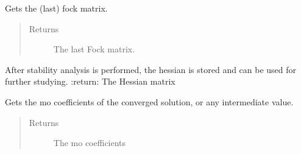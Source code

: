 \documentclass[letterpaper,10pt,english]{sphinxmanual}
\begin{document}
\begin{fulllineitems}
\begin{fulllineitems}
\end{fulllineitems}


\begin{fulllineitems}
\label{\detokenize{GHF:hf.HartreeFock.GHF.MF.get_fock_orth}}
Gets the (last) fock matrix.
\begin{quote}\begin{description}
\item[{Returns}] \leavevmode
The last Fock matrix.

\end{description}\end{quote}

\end{fulllineitems}


\begin{fulllineitems}
\label{\detokenize{GHF:hf.HartreeFock.GHF.MF.get_hessian}}
After stability analysis is performed, the hessian is stored and can be used for further studying.
:return: The Hessian matrix

\end{fulllineitems}


\begin{fulllineitems}
\label{\detokenize{GHF:hf.HartreeFock.GHF.MF.get_mo_coeff}}
Gets the mo coefficients of the converged solution, or any intermediate value.
\begin{quote}\begin{description}
\item[{Returns}] \leavevmode
The mo coefficients

\end{description}\end{quote}

\end{fulllineitems}


\end{fulllineitems}
\end{document}
